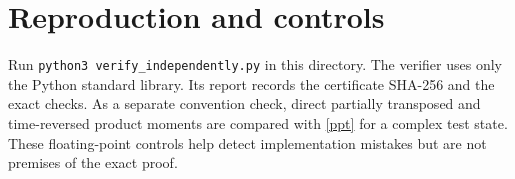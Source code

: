 \documentclass[11pt]{article}
\begin{document}
\section*{Reproduction and controls}
Run \texttt{python3 verify\_independently.py} in this directory.
The verifier uses only the Python standard library. Its report records the
certificate SHA-256 and the exact checks.
As a separate convention check, direct partially transposed and time-reversed
product moments are compared with \eqref{ppt} for a complex test state.
These floating-point controls help detect implementation mistakes but are
not premises of the exact proof.
\end{document}
